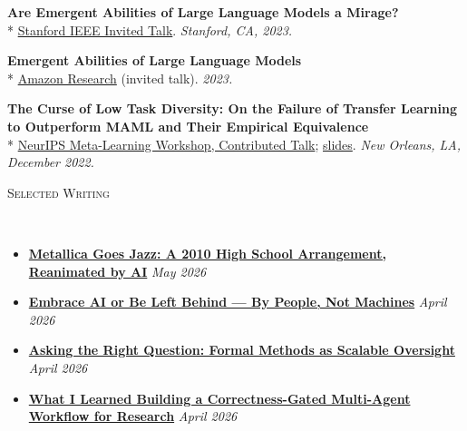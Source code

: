 \documentclass{article}
\newenvironment{changemargin}[2]{%
  \begin{list}{}{%
    \setlength{\topsep}{0pt}%
    \setlength{\leftmargin}{#1}%
    \setlength{\rightmargin}{#2}%
    \setlength{\listparindent}{\parindent}%
    \setlength{\itemindent}{\parindent}%
    \setlength{\parsep}{\parskip}%
  }%
  \item[]}{\end{list}
}
\newcommand{\lineover}{
	\begin{changemargin}{-0.05in}{-0.05in}
		\vspace*{-8pt}
		\hrulefill \\
		\vspace*{-2pt}
	\end{changemargin}
}
\newcommand{\header}[1]{
	\begin{changemargin}{-0.5in}{-0.5in}
		\scshape{#1}\\
  	\lineover
	\end{changemargin}
	\nopagebreak[4]    %
}
\newenvironment{body} {
		\vspace*{-16pt}
		\begin{changemargin}{-0.25in}{-0.5in}
	  }
		{\end{changemargin}\vspace{8pt plus 12pt}
	}
\begin{document}
\begin{body}
    \vspace{8pt}
    \textbf{Are Emergent Abilities of Large Language Models a Mirage?}\\*
    \href{https://docs.google.com/presentation/d/1k-yCVLob1eSyg71jT-k2w2mi--gkTQGAK_H2x3sPqpA/edit?usp=sharing}{Stanford IEEE Invited Talk}. \emph{Stanford, CA, 2023.}

    \vspace{8pt}
    \textbf{Emergent Abilities of Large Language Models}\\*
    \href{https://docs.google.com/presentation/d/1UDqPg06xQKga1oWSEMS2jyzignQwkot6ZbjQMhdZngs/edit?usp=sharing}{Amazon Research} (invited talk). \emph{2023.}

    \vspace{8pt}
    \textbf{The Curse of Low Task Diversity: On the Failure of Transfer Learning to Outperform MAML and Their Empirical Equivalence}\\*
    \href{https://neurips.cc/virtual/2022/63778}{NeurIPS Meta-Learning Workshop, Contributed Talk}; \href{https://docs.google.com/presentation/d/1nY39x8u8j7k6KpOhD6Vqto78YzLOwyR9B24kuoHJijY/edit?usp=sharing}{slides}. \emph{New Orleans, LA, December 2022.}

\end{body}

\header{Selected Writing}

\begin{body}
	\vspace{12pt}
	\begin{itemize} \itemsep -2pt
		\item \textbf{\href{https://cs.stanford.edu/people/brando9/2026/05/07/metallica-goes-jazz.html}{Metallica Goes Jazz: A 2010 High School Arrangement, Reanimated by AI}} \hfill \emph{May 2026}
		\item \textbf{\href{https://cs.stanford.edu/people/brando9/2026/04/27/embrace-ai-or-be-left-behind.html}{Embrace AI or Be Left Behind --- By People, Not Machines}} \hfill \emph{April 2026}
		\item \textbf{\href{https://cs.stanford.edu/people/brando9/2026/04/22/formal-methods-scalable-oversight.html}{Asking the Right Question: Formal Methods as Scalable Oversight}} \hfill \emph{April 2026}
		\item \textbf{\href{https://cs.stanford.edu/people/brando9/2026/04/13/correctness-gated-multi-agent-workflow.html}{What I Learned Building a Correctness-Gated Multi-Agent Workflow for Research}} \hfill \emph{April 2026}
	\end{itemize}
\end{body}
\end{document}
